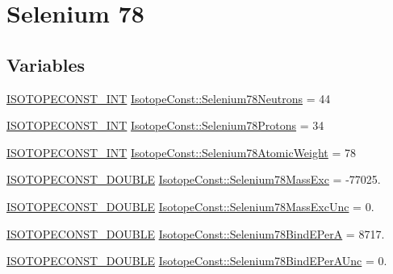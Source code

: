 \hypertarget{group___isotope_const-_selenium-_se78}{}\section{Selenium 78}
\label{group___isotope_const-_selenium-_se78}
\subsection*{Variables}
\begin{DoxyCompactItemize}
\item 
\mbox{\hyperlink{group___isotope_const-_macros_ga5f18360b3e99483a35c32d789e62621c}{I\+S\+O\+T\+O\+P\+E\+C\+O\+N\+S\+T\+\_\+\+I\+NT}} \mbox{\hyperlink{group___isotope_const-_selenium-_se78_ga021a56e76efc6f3122666b2c4f2b00e4}{Isotope\+Const\+::\+Selenium78\+Neutrons}} = 44
\item 
\mbox{\hyperlink{group___isotope_const-_macros_ga5f18360b3e99483a35c32d789e62621c}{I\+S\+O\+T\+O\+P\+E\+C\+O\+N\+S\+T\+\_\+\+I\+NT}} \mbox{\hyperlink{group___isotope_const-_selenium-_se78_gad80d21eb8d62c6b1212475176fc8cdc3}{Isotope\+Const\+::\+Selenium78\+Protons}} = 34
\item 
\mbox{\hyperlink{group___isotope_const-_macros_ga5f18360b3e99483a35c32d789e62621c}{I\+S\+O\+T\+O\+P\+E\+C\+O\+N\+S\+T\+\_\+\+I\+NT}} \mbox{\hyperlink{group___isotope_const-_selenium-_se78_ga4db90437ef1fc89406e99388b7fac0a6}{Isotope\+Const\+::\+Selenium78\+Atomic\+Weight}} = 78
\item 
\mbox{\hyperlink{group___isotope_const-_macros_ga8f45a7272ce02c0b4c65c44636ed719a}{I\+S\+O\+T\+O\+P\+E\+C\+O\+N\+S\+T\+\_\+\+D\+O\+U\+B\+LE}} \mbox{\hyperlink{group___isotope_const-_selenium-_se78_ga114aaf4b1f9131ce7632d25ad1a3449e}{Isotope\+Const\+::\+Selenium78\+Mass\+Exc}} = -\/77025.
\item 
\mbox{\hyperlink{group___isotope_const-_macros_ga8f45a7272ce02c0b4c65c44636ed719a}{I\+S\+O\+T\+O\+P\+E\+C\+O\+N\+S\+T\+\_\+\+D\+O\+U\+B\+LE}} \mbox{\hyperlink{group___isotope_const-_selenium-_se78_gabede438fcba615df6599b1e0838d2f48}{Isotope\+Const\+::\+Selenium78\+Mass\+Exc\+Unc}} = 0.
\item 
\mbox{\hyperlink{group___isotope_const-_macros_ga8f45a7272ce02c0b4c65c44636ed719a}{I\+S\+O\+T\+O\+P\+E\+C\+O\+N\+S\+T\+\_\+\+D\+O\+U\+B\+LE}} \mbox{\hyperlink{group___isotope_const-_selenium-_se78_ga4f9576291f2ccaaf9259ee3e3dfb4fe9}{Isotope\+Const\+::\+Selenium78\+Bind\+E\+PerA}} = 8717.
\item 
\mbox{\hyperlink{group___isotope_const-_macros_ga8f45a7272ce02c0b4c65c44636ed719a}{I\+S\+O\+T\+O\+P\+E\+C\+O\+N\+S\+T\+\_\+\+D\+O\+U\+B\+LE}} \mbox{\hyperlink{group___isotope_const-_selenium-_se78_gae36c652f7c35db835673cea8078da079}{Isotope\+Const\+::\+Selenium78\+Bind\+E\+Per\+A\+Unc}} = 0.

\end{DoxyCompactItemize}
